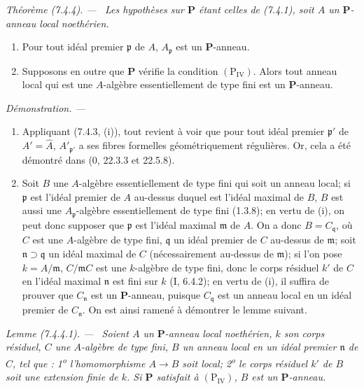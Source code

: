 \documentclass[10pt,oneside]{book}
\newcommand{\oldpage}[2][]{%
  \setcounter{footnote}{0}%
  \marginpar{\scriptsize\textbf{#1}~|~#2}\ignorespaces}
\newenvironment{theorem}[1][]{%
  \par\medskip\noindent\itshape Théorème (#1). ---\ }{\par}
\newenvironment{lemma}[1][]{%
  \par\medskip\noindent\itshape Lemme (#1). ---\ }{\par}
\newenvironment{proof}{%
  \par\medskip\noindent\textit{Démonstration. ---\ }}{\par}
\begin{document}
\begin{theorem}[7.4.4]
\label{IV.2.s7.4.4-fr}
Les hypothèses sur $\boldsymbol P$ étant celles de (7.4.1), soit $A$ un
$\boldsymbol P$-anneau local noethérien.
\begin{enumerate}
\item[\emph{(i)}] Pour tout idéal premier $\mathfrak p$ de $A$,
$A_{\mathfrak p}$ est un $\boldsymbol P$-anneau.
\item[\emph{(ii)}] Supposons en outre que $\boldsymbol P$ vérifie la condition
$(\mathrm P_{\mathrm{IV}})$. Alors tout anneau local qui est une
$A$-algèbre essentiellement de type fini est un $\boldsymbol P$-anneau.
\end{enumerate}
\end{theorem}

\begin{proof}
\begin{enumerate}
\item[\emph{(i)}] Appliquant (7.4.3, (i)), tout revient à voir que pour tout
idéal premier $\mathfrak p'$ de $A'=\widehat A$,
$A'_{\mathfrak p'}$ a ses fibres formelles géométriquement régulières. Or,
cela a été démontré dans (0, 22.3.3 et 22.5.8).

\oldpage[IV-2]{200}

\item[\emph{(ii)}] Soit $B$ une $A$-algèbre essentiellement de type fini qui
soit un anneau local; si $\mathfrak p$ est l'idéal premier de $A$ au-dessus
duquel est l'idéal maximal de $B$, $B$ est aussi une
$A_{\mathfrak p}$-algèbre essentiellement de type fini (1.3.8); en vertu de
(i), on peut donc supposer que $\mathfrak p$ est l'idéal maximal $\mathfrak m$
de $A$. On a donc $B=C_{\mathfrak q}$, où $C$ est une $A$-algèbre de type
fini, $\mathfrak q$ un idéal premier de $C$ au-dessus de $\mathfrak m$; soit
$\mathfrak n\supset\mathfrak q$ un idéal maximal de $C$ (nécessairement
au-dessus de $\mathfrak m$); si l'on pose $k=A/\mathfrak m$,
$C/\mathfrak mC$ est une $k$-algèbre de type fini, donc le corps résiduel
$k'$ de $C$ en l'idéal maximal $\mathfrak n$ est fini sur $k$ (I, 6.4.2);
en vertu de (i), il suffira de prouver que $C_{\mathfrak n}$ est un
$\boldsymbol P$-anneau, puisque $C_{\mathfrak q}$ est un anneau local en un
idéal premier de $C_{\mathfrak n}$. On est ainsi ramené à démontrer le
lemme suivant.
\end{enumerate}
\end{proof}

\begin{lemma}[7.4.4.1]
\label{IV.2.s7.4.4.1-fr}
Soient $A$ un $\boldsymbol P$-anneau local noethérien, $k$ son corps
résiduel, $C$ une $A$-algèbre de type fini, $B$ un anneau local en un idéal
premier $\mathfrak n$ de $C$, tel que : 1\textsuperscript{o}
l'homomorphisme $A\to B$ soit local; 2\textsuperscript{o} le corps résiduel
$k'$ de $B$ soit une extension finie de $k$. Si $\boldsymbol P$ satisfait à
$(\mathrm P_{\mathrm{IV}})$, $B$ est un $\boldsymbol P$-anneau.
\end{lemma}
\end{document}
